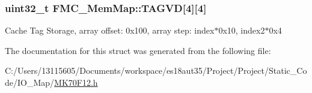 \subsubsection[{T\+A\+G\+V\+D}]{\setlength{\rightskip}{0pt plus 5cm}uint32\+\_\+t F\+M\+C\+\_\+\+Mem\+Map\+::\+T\+A\+G\+V\+D\mbox{[}4\mbox{]}\mbox{[}4\mbox{]}}\label{struct_f_m_c___mem_map_aceee42cbeff95639e3a10a33f88ecb02}
Cache Tag Storage, array offset\+: 0x100, array step\+: index$\ast$0x10, index2$\ast$0x4 

The documentation for this struct was generated from the following file\+:\begin{DoxyCompactItemize}
\item 
C\+:/\+Users/13115605/\+Documents/workspace/es18aut35/\+Project/\+Project/\+Static\+\_\+\+Code/\+I\+O\+\_\+\+Map/\hyperlink{_m_k70_f12_8h}{M\+K70\+F12.\+h}\end{DoxyCompactItemize}
